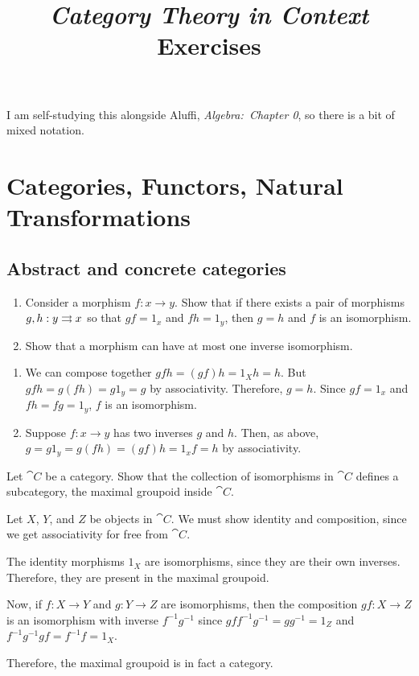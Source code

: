 \documentclass[notes,tikz]{agony}
\title{\emph{Category Theory in Context} Exercises}
\renewcommand{\C}{\cat{C}}
\newcommand{\inenum}{\vspace{-1.8em}}
\begin{document}
\thispagestyle{firstpage}
\renewcommand{\contentsname}{Exercises\\{\Large from Riehl, \emph{Category Theory in Context}}}
\tableofcontents

I am self-studying this alongside Aluffi, \emph{Algebra:\ Chapter 0},
so there is a bit of mixed notation.

\chapter{Categories, Functors, Natural Transformations}

\section{Abstract and concrete categories}

\begin{xca}
  \leavevmode
  \begin{enumerate}
    \item Consider a morphism $f : x \to y$.
          Show that if there exists a pair of morphisms $g, h : y \rightrightarrows x$
          so that $g f = 1_x$ and $f h = 1_y$, then $g = h$ and $f$ is an isomorphism.
    \item Show that a morphism can have at most one inverse isomorphism.
  \end{enumerate}
\end{xca}
\begin{enumerate}
  \item \begin{prf}\inenum
          We can compose together $gfh = (gf)h = 1_Xh = h$.
          But $gfh = g(fh) = g1_y = g$ by associativity.
          Therefore, $g = h$.
          Since $gf = 1_x$ and $fh = fg = 1_y$, $f$ is an isomorphism.
        \end{prf}
  \item \begin{prf}\inenum
          Suppose $f : x \to y$ has two inverses $g$ and $h$.
          Then, as above, $g = g1_y = g(fh) = (gf)h = 1_xf = h$ by associativity.
        \end{prf}
\end{enumerate}

\begin{xca}
  Let $\C$ be a category.
  Show that the collection of isomorphisms in $\C$ defines a subcategory,
  the maximal groupoid inside $\C$.
\end{xca}
\begin{prf}
  Let $X$, $Y$, and $Z$ be objects in $\C$.
  We must show identity and composition, since we get associativity for free from $\C$.

  The identity morphisms $1_X$ are isomorphisms, since they are their own inverses.
  Therefore, they are present in the maximal groupoid.

  Now, if $f : X \to Y$ and $g : Y \to Z$ are isomorphisms,
  then the composition $gf : X \to Z$ is an isomorphism with inverse $f^{-1}g^{-1}$
  since $gff^{-1}g^{-1} = gg^{-1} = 1_Z$ and $f^{-1}g^{-1}gf = f^{-1}f = 1_X$.

  Therefore, the maximal groupoid is in fact a category.
\end{prf}
\end{document}

